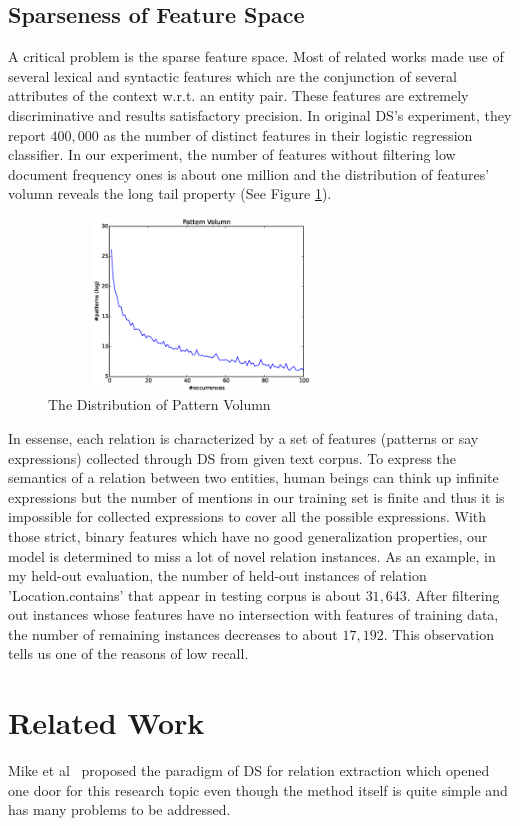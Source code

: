 \documentclass[10pt]{article} %
\theoremstyle{definition}
\theoremstyle{definition}
\begin{document}
\subsection{Sparseness of Feature Space}
A critical problem is the sparse feature space. 
Most of related works made use of several lexical and syntactic features which are the conjunction of several attributes of the context w.r.t. an entity pair. 
These features are extremely discriminative and results satisfactory precision. 
In original DS's experiment, they report $400,000$ as the number of distinct features in their logistic regression classifier. 
In our experiment, the number of features without filtering low document frequency ones is about one million and the distribution of features' volumn reveals the long tail property (See Figure \ref{fig:pv}). 
\begin{figure}
\centering
\includegraphics[width=3.2in,height=1.8in]{pv.eps}
\caption{The Distribution of Pattern Volumn}
\label{fig:pv}
\end{figure}
In essense, each relation is characterized by a set of features (patterns or say expressions) collected through DS from given text corpus. 
To express the semantics of a relation between two entities, human beings can think up infinite expressions 
but the number of mentions in our training set is finite and thus it is impossible for collected expressions to cover all the possible expressions. 
With those strict, binary features which have no good generalization properties, our model is determined to miss a lot of novel relation instances. 
As an example, in my held-out evaluation, the number of held-out instances of relation 'Location.contains' that appear in testing corpus is about $31,643$. 
After filtering out instances whose features have no intersection with features of training data, the number of remaining instances decreases to about $17,192$. 
This observation tells us one of the reasons of low recall. 



\section{Related Work}
Mike et al~\cite{mintz} proposed the paradigm of DS for relation extraction which opened one door for this research topic even though the method itself is quite simple and has many problems to be addressed. 
\end{document}
